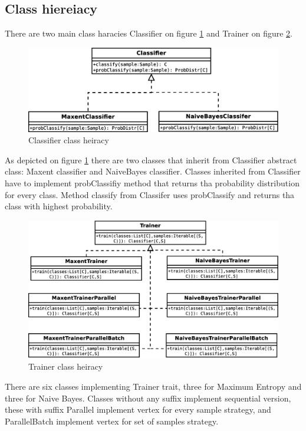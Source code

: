 \documentclass{report}
\begin{document}
\subsection{Class hiereiacy}

There are two main class haracies Classifier on figure \ref{fig:classes1} and Trainer on figure \ref{fig:classes2}.
 
\begin{figure}[!htb]
  \centering
  \includegraphics*[scale=0.45]{classes1.eps}
  \caption{Classifier class heiracy}
  \label{fig:classes1}
\end{figure}

As depicted on figure \ref{fig:classes1} there are two classes that inherit from Classifier abstract class: Maxent classifier and NaiveBayes classifier. Classes inherited from Classifier have to implement probClassifiy method that returns tha probability distribution for every class. Method classify from Classifer uses probClassify and returns tha class with highest probability.

\begin{figure}[!htb]
  \centering
  \includegraphics*[scale=0.45]{classes2.eps}
  \caption{Trainer class heiracy}
  \label{fig:classes2}
\end{figure}

There are six classes  implementing Trainer trait, three for Maximum Entropy and three for Naive Bayes. Classes without any suffix implement sequential version, these with suffix Parallel implement vertex for every sample strategy, and ParallelBatch implement vertex for set of samples strategy.
\end{document}

